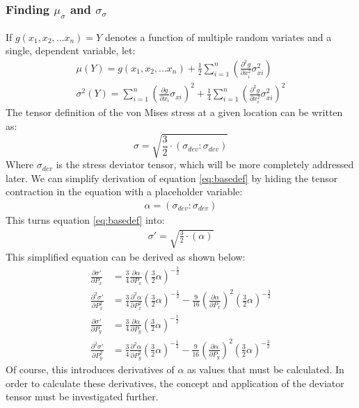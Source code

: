 \subsubsection{Finding $\mu_\sigma$ and $\sigma_\sigma$}
If $g(x_1, x_2, ... x_n) = Y$ denotes a function of multiple random variates and a single, dependent variable, let: 
   \begin{align}
	   \mu(Y) = g(x_1, x_2, ... x_n) + \frac{1}{2} \sum_{i=1}^{n}\left( \frac{\partial^2 g}{\partial x_i^2} \sigma_{xi}^2  \right)
	            \label{eq:mu}\\
	   \sigma^2(Y) = \sum_{i=1}^{n}\left( \frac{\partial g}{\partial x_i} \sigma_{xi}  \right)^2 + 
			 \frac{1}{4} \sum_{i=1}^{n}\left( \frac{\partial^2 g}{\partial x_i^2} \sigma_{xi}^2  \right)^2 \label{eq:sigma}
   \end{align}
The tensor definition of the von Mises stress at a given location can be written as:
   \begin{equation}
      \sigma = \sqrt{\frac{3}{2} \cdot \left(\sigma_{dev}:\sigma_{dev} \right)}
	\label{eq:basedef}
   \end{equation}
Where $\sigma_{dev}$ is the stress deviator tensor, which will be more completely addressed later. 
We can simplify derivation of equation \ref{eq:basedef} by hiding the tensor contraction in the equation with a placeholder variable:
   \begin{align}
	   \alpha = (\sigma_{dev}:\sigma_{dev})
	   \label{eq:defalpha}
   \end{align}
This turns equation \ref{eq:basedef} into:
   \begin{align}
      \sigma' = \sqrt{\frac{3}{2} \cdot \left(\alpha\right)}
   \end{align}
This simplified equation can be derived as shown below: 
   \begin{align}
	   \frac{\partial \sigma'}{\partial P_x} &= \frac{3}{4} \frac{\partial \alpha}{\partial P_x} 
						    \left( \frac{3}{2} \alpha \right)^{-\frac{1}{2}}\label{eq:fd_vmx}\\
	   \frac{\partial^2 \sigma'}{\partial P_x^2} &= \frac{3}{4} \frac{\partial ^2 \alpha}{\partial P_x^2}
	                                                \left( \frac{3}{2} \alpha \right)^{-\frac{1}{2}} - 
							\frac{9}{16} \left(\frac{\partial \alpha}{\partial P_x}\right)^2
							\left( \frac{3}{2} \alpha \right)^{-\frac{3}{2}}\\
	   \frac{\partial \sigma'}{\partial P_y} &= \frac{3}{4} \frac{\partial \alpha}{\partial P_y} 
	                                            \left( \frac{3}{2} \alpha \right)^{-\frac{1}{2}}\\
	   \frac{\partial^2 \sigma'}{\partial P_y^2} &= \frac{3}{4} \frac{\partial ^2 \alpha}{\partial P_y^2}
	                                                \left( \frac{3}{2} \alpha \right)^{-\frac{1}{2}} - 
							\frac{9}{16} \left(\frac{\partial \alpha}{\partial P_y}\right)^2
							\left( \frac{3}{2} \alpha \right)^{-\frac{3}{2}}\label{eq:sd_vmy}
   \end{align}
Of course, this introduces derivatives of $\alpha$ as values that must be calculated. In order to calculate these derivatives, the concept and application of the deviator tensor must be investigated further.


